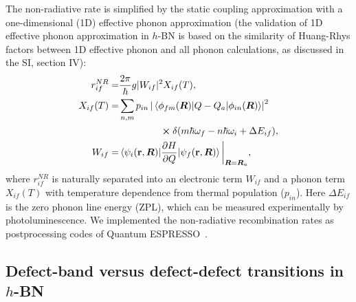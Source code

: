 The non-radiative rate is simplified by the static coupling approximation with a one-dimensional (1D) effective phonon approximation\cite{alkauskas2014first1,alkauskas2014first2,barmparis2015theory,alkauskas2012first,alkauskas2016tutorial,brawand2015surface,giustino2017electron,henry1977nonradiative,howgate1969calculation,monserrat2018phonon,passler1974description,passler1976relationships,shi2012ab,shi2015comparative,wickramaratne2018comment,shi2018reply,yang2016non,Book_TheoryofDefects_Stoneham} (the validation of 1D effective phonon approximation in $h$-BN is based on the similarity of Huang-Rhys factors between 1D effective phonon and all phonon calculations, as discussed in the SI, section IV):
\begin{align}
r_{if}^{NR} =& \frac{2\pi}{\hbar}g|W_{if}|^2 X_{if}(T), \label{eq:rate-nonrad-allterms}\\
X_{if}(T)=& \sum_{n,m}p_{in}\left|\mel{\phi_{fm}(\vR)}{Q-Q_a}{\phi_{in}(\vR)}\right|^2 \nonumber \\
& \hspace{1.5cm} \cross \delta(m\hbar\omega_f - n\hbar\omega_i+\Delta E_{if}), \label{eq:rate-nonrad-X} \\
W_{if} =& \mel{\psi_i(\mathbf{r},\vR)}{\frac{\partial H}{\partial Q}}{\psi_f(\mathbf{r},\vR)}\bigg{|}_{\vR=\vR_a},
\end{align}
where $r_{if}^{NR}$ is naturally separated into an electronic term $W_{if}$ and a phonon term $X_{if}(T)$ with temperature dependence from thermal population ($p_{in}$). Here $\Delta E_{if}$ is the zero phonon line energy (ZPL), which can be measured experimentally by photoluminescence. We implemented the non-radiative recombination rates as postprocessing codes of Quantum ESPRESSO~\cite{QE1}.

\subsection{Defect-band versus defect-defect transitions in $h$-BN}


